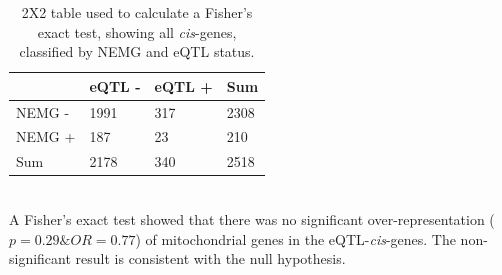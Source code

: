 \documentclass{article}
\begin{document}
\begin{table}[h]
    \centering
    \caption{2X2 table used to calculate a Fisher's exact test, showing all \textit{cis}-genes, classified by NEMG and eQTL status.}
    \begin{tabular}{|l|l|l|l|}
        \hline
               & eQTL - & eQTL + & Sum  \\ \hline
        NEMG - &  1991    &  317    & 2308  \\ \hline
        NEMG + & 187   &  23  &  210\\ \hline
        Sum    & 2178   & 340    & 2518 \\ \hline
    \end{tabular}
\end{table}
\\A Fisher's exact test showed that there was no significant over-representation ($p = 0.29 \& OR = 0.77$) of mitochondrial genes in the eQTL-\textit{cis}-genes. The non-significant result is consistent with the null hypothesis. 
\end{document}
